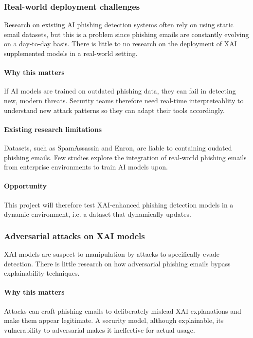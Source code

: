 \subsubsection*{Real-world deployment challenges}
Research on existing AI phishing detection systems often rely on using static email datasets, but this is a problem since phishing emails are constantly evolving on a day-to-day basis. There is little to no research on the deployment of XAI supplemented models in a real-world setting.

\paragraph{Why this matters}
If AI models are trained on outdated phishing data, they can fail in detecting new, modern threats. Security teams therefore need real-time interpreteablity to understand new attack patterns so they can adapt their tools accordingly.

\paragraph{Existing research limitations}
Datasets, such as SpamAssassin and Enron, are liable to containing oudated phishing emails. Few studies explore the integration of real-world phishing emails from enterprise environments to train AI models upon.

\paragraph{Opportunity}
This project will therefore test XAI-enhanced phishing detection models in a dynamic environment, i.e. a dataset that dynamically updates.

\subsubsection*{Adversarial attacks on XAI models}
XAI models are suspect to manipulation by attacks to specifically evade detection. There is little research on how adversarial phishing emails bypass explainability techniques.

\paragraph{Why this matters}
Attacks can craft phishing emails to deliberately mislead XAI explanations and make them appear legitimate. A security model, although explainable, its vulnerability to adversarial makes it ineffective for actual usage.

